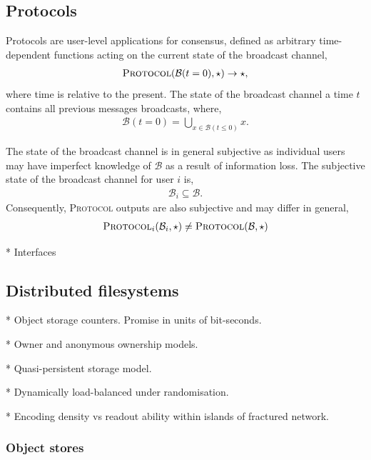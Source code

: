 \subsection{Protocols}

Protocols are user-level applications for consensus, defined as arbitrary time-dependent functions acting on the current state of the broadcast channel,
\begin{align}
	\textsc{Protocol}(\mathcal{B}(t=0),\star)\to \star,
\end{align}
where time is relative to the present. The state of the broadcast channel a time $t$ contains all previous messages broadcasts,
where,
\begin{align}
	\mathcal{B}(t=0) = \bigcup_{x\in \mathcal{B}(t\leq 0)} x.
\end{align}

The state of the broadcast channel is in general subjective as individual users may have imperfect knowledge of $\mathcal{B}$ as a result of information loss. The subjective state of the broadcast channel for user $i$ is,
\begin{align}
	\mathcal{B}_i \subseteq \mathcal{B}.
\end{align}
Consequently, \textsc{Protocol} outputs are also subjective and may differ in general,
\begin{align}
	\textsc{Protocol}_i(\mathcal{B}_i,\star) \neq \textsc{Protocol}(\mathcal{B},\star)
\end{align}

* Interfaces

\subsection{Distributed filesystems}

* Object storage counters. Promise in units of bit-seconds.

* Owner and anonymous ownership models.

* Quasi-persistent storage model.

* Dynamically load-balanced under randomisation.

* Encoding density vs readout ability within islands of fractured network.

\subsubsection{Object stores}

